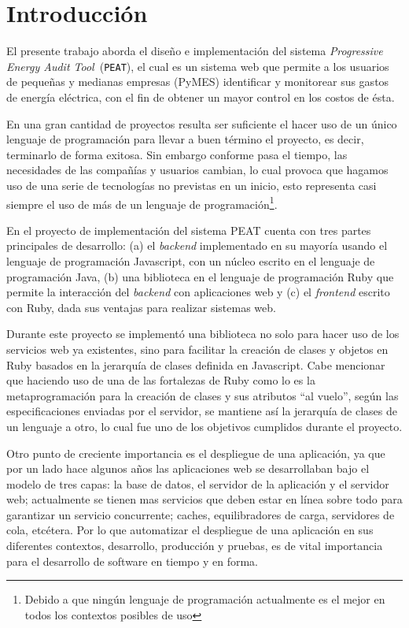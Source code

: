 \chapter*{Introducción}
El presente trabajo aborda el diseño e implementación del sistema \textit{Progressive
  Energy Audit Tool}\ (\texttt{PEAT}), el cual es un sistema web que permite
a los usuarios de pequeñas y medianas empresas (PyMES) identificar y monitorear
sus gastos de energía eléctrica, con el fin de obtener un mayor control
en los costos de ésta.

En una gran cantidad de proyectos resulta ser suficiente el hacer uso de un
único lenguaje de programación para llevar a buen término el proyecto, es decir,
terminarlo de forma exitosa. Sin embargo conforme pasa el tiempo, las necesidades
de las compañías y usuarios cambian, lo cual provoca que hagamos uso de una serie de
tecnologías no previstas en un inicio, esto representa casi siempre el uso
de más de un lenguaje de programación\footnote{Debido a que ningún
lenguaje de programación actualmente es el mejor en todos los contextos
posibles de uso}.

En el proyecto de implementación del sistema PEAT cuenta con tres partes principales
de desarrollo: (a) el \textit{backend}  implementado en su mayoría usando
el lenguaje de programación Javascript, con un núcleo escrito en el lenguaje de
programación Java, (b) una biblioteca en el lenguaje de programación Ruby que permite
la interacción del \textit{backend} con aplicaciones web y (c) el \textit{frontend}
escrito con Ruby, dada sus ventajas para realizar sistemas web.

Durante este proyecto se implementó una biblioteca no solo para hacer uso de
los servicios web ya existentes, sino para facilitar la creación
de clases y objetos en Ruby basados en la jerarquía de clases definida
en Javascript. Cabe mencionar que haciendo uso de una de las fortalezas de Ruby
como lo es la metaprogramación para la creación de clases y sus
atributos ``al vuelo'', según las especificaciones enviadas por el servidor,
se mantiene así la jerarquía de clases de un lenguaje a otro, lo cual fue uno
de los objetivos cumplidos durante el proyecto.

Otro punto de creciente importancia es el despliegue de una aplicación, ya que por un
lado hace algunos años las aplicaciones web se desarrollaban bajo el modelo de
tres capas: la base de datos, el servidor de la aplicación y el servidor web;
actualmente se tienen mas servicios que deben estar en línea sobre todo para
garantizar un servicio concurrente; caches, equilibradores de carga, servidores
de cola, etcétera. Por lo que automatizar el despliegue de una aplicación en sus
diferentes contextos, desarrollo, producción y pruebas, es de vital importancia
para el desarrollo de software en tiempo y en forma.

